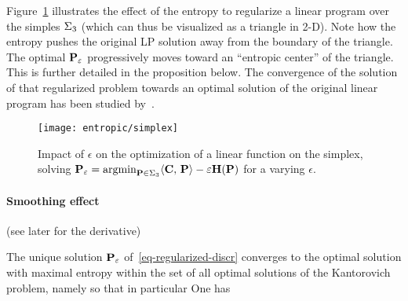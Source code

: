 Figure~\ref{fig-impact-eps} illustrates the effect of the entropy to regularize a linear program over the simples $\simplex_3$ (which can thus be visualized as a triangle in 2-D). Note how the entropy pushes the original LP solution away from the boundary of the triangle. The optimal $\P_\epsilon$ progressively moves toward an ``entropic center'' of the triangle. This is further detailed in the proposition below. The convergence of the solution of that regularized problem towards an optimal solution of the original linear program has been studied by~\cite{CominettiAsympt}.


\begin{figure}
\centering
\texttt{[image: entropic/simplex]}
\caption{\label{fig-impact-eps}
Impact of $\epsilon$ on the optimization of a linear function on the simplex, solving $\P_\epsilon = \argmin_{\P \in \simplex_3} \dotp{\C}{\P}-\epsilon\HD(\P)$ for a varying $\epsilon$. 
}
\end{figure}


\paragraph{Smoothing effect}

 (see later for the derivative)
 
 
\begin{prop}\label{prop-convergence-eps}
The unique solution $\P_\epsilon$ of~\eqref{eq-regularized-discr} converges to the optimal solution with maximal entropy within the set of all optimal solutions of the Kantorovich problem, namely
so that in particular
One has
\end{prop}

